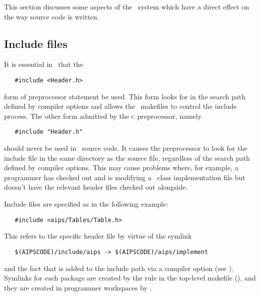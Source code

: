 This section discusses some aspects of the \aipspp\ system which have a direct
effect on the way source code is written.

\subsection*{Include files}

It is essential in \aipspp\ that the

\begin{verbatim}
   #include <Header.h>
\end{verbatim}

\noindent
form of preprocessor  statement be used.  This form looks for
 in the search path defined by  compiler options and
allows the \aipspp\ makefiles to control the include process.  The other form
admitted by the \textsc{c} preprocessor, namely

\begin{verbatim}
   #include "Header.h"
\end{verbatim}

\noindent
should never be used in \aipspp\ source code.  It causes the preprocessor to
look for the include file in the same directory as the source file, regardless
of the search path defined by  compiler options.  This may cause
problems where, for example, a programmer has checked out and is modifying a
\cplusplus\ class implementation file but doesn't have the relevant header
files checked out alongside.

Include files are specified as in the following example:

\begin{verbatim}
   #include <aips/Tables/Table.h>
\end{verbatim}

\noindent
This refers to the specific header file
 by virtue of the symlink

\begin{verbatim}
   $(AIPSCODE)/include/aips -> $(AIPSCODE)/aips/implement
\end{verbatim}

\noindent
and the fact that  is added to the include path via
a  compiler option (see ).  Symlinks for each
package are created by the  rule in the top-level makefile
(), and they are created in programmer
workspaces by .


